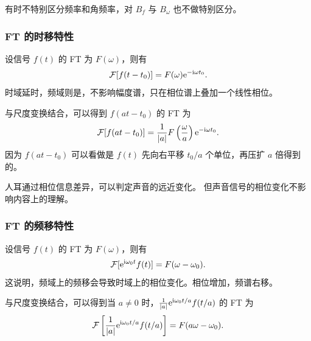 \begin{note}
    有时不特别区分频率和角频率，对 $B_f$ 与 $B_\omega$ 也不做特别区分。
\end{note}

\subsubsection{FT 的时移特性}

\begin{property}
    设信号 $f(t)$ 的 FT 为 $F(\omega)$，则有
    \begin{align*}
        \mathcal{F}[f(t - t_0)] = F(\omega)\mathrm{e}^{-\mathrm{i}\omega t_0}.
    \end{align*}
    时域延时，频域则是，不影响幅度谱，只在相位谱上叠加一个线性相位。

    与尺度变换结合，可以得到 $f(at - t_0)$ 的 FT 为
    \begin{align*}
        \mathcal{F}[f(at - t_0)] = \frac{1}{|a|}F\left(\frac{\omega}{a}\right)\mathrm{e}^{-\mathrm{i}\omega t_0}.
    \end{align*}
    因为 $f(at - t_0)$ 可以看做是 $f(t)$ 先向右平移 $t_0 / a$ 个单位，再压扩 $a$ 倍得到的。
\end{property}

\begin{remark}
    人耳通过相位信息差异，可以判定声音的远近变化。
    但声音信号的相位变化不影响内容上的理解。
\end{remark}

\subsubsection{FT 的频移特性}

\begin{property}
    设信号 $f(t)$ 的 FT 为 $F(\omega)$，则有
    \begin{align*}
        \mathcal{F}[\mathrm{e}^{\mathrm{i}\omega_0 t}f(t)] = F(\omega - \omega_0).
    \end{align*}
    这说明，频域上的频移会导致时域上的相位变化。相位增加，频谱右移。

    与尺度变换结合，可以得到当 $a \neq 0$ 时，$\frac{1}{|a|}\mathrm{e}^{\mathrm{i}\omega_0 t/a}f(t/a)$ 的 FT 为
    \begin{align*}
        \mathcal{F}\left[\frac{1}{|a|}\mathrm{e}^{\mathrm{i}\omega_0 t/a}f(t/a)\right] = F(a\omega - \omega_0).
    \end{align*}
\end{property}


